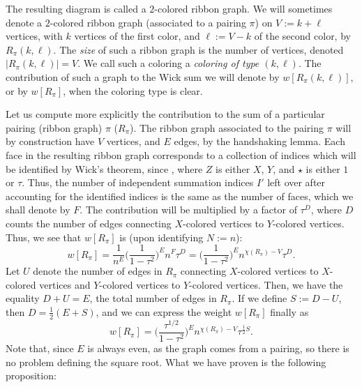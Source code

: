 \documentclass[pdftex]{sigma}
\numberwithin{equation}{section}
\begin{document}
The resulting diagram is called a $2$-colored ribbon graph. We will sometimes denote a $2$-colored ribbon graph (associated to a pairing $\pi$)
on $V:= k+\ell$ vertices, with $k$ vertices of the first color, and $\ell := V-k$ of the second color, by $R_{\pi}(k,\ell)$. The \textit{size} of such a ribbon graph is the number of vertices, denoted $|R_{\pi}(k,\ell)| = V$. We call such a coloring a \textit{coloring of type $(k,\ell)$}.
The contribution of such a graph to the Wick sum we will denote by $w[R_{\pi}(k,\ell)]$, or by $w[R_{\pi}]$, when the coloring type is
clear.

Let us compute more explicitly the contribution to the sum of a particular pairing (ribbon graph) $\pi$ ($R_{\pi}$).
The ribbon graph associated to the pairing $\pi$ will by construction have $V$ vertices, and $E$ edges, by the handshaking lemma.
Each face in the resulting ribbon graph corresponds to a collection of indices which will be identified by Wick's theorem, since , where $Z$ is either $X$, $Y$, and $\star$ is either $1$ or $\tau$. Thus,
the number of independent summation indices $I'$ left over after accounting for the identified indices is the same as the number of faces, which
we shall denote by $F$. The contribution will be multiplied by a factor of $\tau^D$, where $D$ counts
the number of edges connecting $X$-colored vertices to $Y$-colored vertices. Thus, we see that $w[R_{\pi}]$ is (upon identifying
$N := n$):
 \begin{equation*}
 w[R_{\pi}] = \frac{1}{n^E} \biggl(\frac{1}{1-\tau^2}\biggr)^E n^F \tau^D = \biggl(\frac{1}{1-\tau^2}\biggr)^E n^{\chi(R_{\pi}) -V} \tau^D.
 \end{equation*}
Let $U$ denote the number of edges in $R_{\pi}$ connecting $X$-colored vertices to $X$-colored vertices and $Y$-colored vertices to
$Y$-colored vertices.
Then, we have the equality $D+U = E$, the total number of edges in $R_{\pi}$. If we define $S := D - U$, then $D = \frac{1}{2}(E+S)$, and
we can express the weight $w[R_{\pi}]$ finally as
 \begin{equation}\label{C2:colored-weight-expression}
 w[R_{\pi}] = \biggl(\frac{\tau^{1/2}}{1-\tau^2}\biggr)^E n^{\chi(R_{\pi}) -V}\tau^{\frac{1}{2}S}.
 \end{equation}
Note that, since $E$ is always even, as the graph comes from a pairing, so there is no problem defining the square root.
What we have proven is the following proposition:
\end{document}

